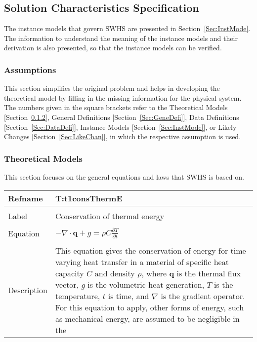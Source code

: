 \documentclass[12pt]{article}
\begin{document}
\subsection{Solution Characteristics Specification}
\label{Sec:SoluCharSpec}
The instance models that govern SWHS are presented in Section~\ref{Sec:InstMode}. The information to understand the meaning of the instance models and their derivation is also presented, so that the instance models can be verified.
\subsubsection{Assumptions}
\label{Sec:Assu}
This section simplifies the original problem and helps in developing the theoretical model by filling in the missing information for the physical system. The numbers given in the square brackets refer to the Theoretical Models [Section~\ref{Sec:TheoMode}], General Definitions [Section~\ref{Sec:GeneDefi}], Data Definitions [Section~\ref{Sec:DataDefi}], Instance Models [Section~\ref{Sec:InstMode}], or Likely Changes [Section~\ref{Sec:LikeChan}], in which the respective assumption is used.
\subsubsection{Theoretical Models}
\label{Sec:TheoMode}
This section focuses on the general equations and laws that SWHS is based on.
~\newline
\noindent \begin{minipage}{\textwidth}
\begin{tabular}{p{} p{}}
\toprule \textbf{Refname} & \textbf{T:t1consThermE}
\label{T:t1consThermE}
\\ \midrule \\
Label & Conservation of thermal energy
\\ \midrule \\
Equation & $-\nabla{}\cdot{}\mathbf{q}+g=\rho{}C\frac{\partial{}T}{\partial{}t}$
\\ \midrule \\
Description & This equation gives the conservation of energy for time varying heat transfer in a material of specific heat capacity $C$ and density $\rho{}$, where $\mathbf{q}$ is the thermal flux vector, $g$ is the volumetric heat generation, $T$ is the temperature, $t$ is time, and $\nabla{}$ is the gradient operator. For this equation to apply, other forms of energy, such as mechanical energy, are assumed to be negligible in the
\\ \bottomrule \end{tabular}
\end{minipage}\\
\end{document}
